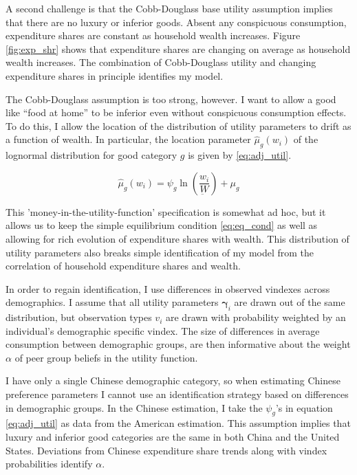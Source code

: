 A second challenge is that the Cobb-Douglass base utility assumption implies that there are no luxury or inferior goods.  Absent any conspicuous consumption, expenditure shares are constant as household  wealth increases.  Figure \ref{fig:exp_shr} shows that expenditure shares are changing on average as household wealth increases.  The combination of Cobb-Douglass utility and changing expenditure shares in principle identifies my model.

The Cobb-Douglass assumption is too strong, however.  I want to allow a good like ``food at home'' to be inferior even without conspicuous consumption effects.  To do this, I allow the location of the distribution of utility parameters to drift as a function of wealth.  In particular, the location parameter $\hat{\mu}_g(w_i)$ of the lognormal distribution for good category $g$ is given by \eqref{eq:adj_util}.

\begin{equation}
    \label{eq:adj_util}
    \hat{\mu}_g(w_i) = \psi_g \ln \left(\frac{w_i}{\underbar{W}}\right) + \mu_g
\end{equation}

This 'money-in-the-utility-function' specification is somewhat ad hoc, but it allows us to keep the simple equilibrium condition \eqref{eq:eq_cond} as well as allowing for rich evolution of expenditure shares with wealth.  This distribution of utility parameters also breaks simple identification of my model from the correlation of household expenditure shares and wealth.

In order to regain identification, I use differences in observed vindexes across demographics.  I assume that all utility parameters $\boldsymbol{\gamma}_i$ are drawn out of the same distribution, but observation types $v_i$ are drawn with probability weighted by an individual's demographic specific vindex.  The size of differences in average consumption between demographic groups, are then informative about the weight $\alpha$ of peer group beliefs in the utility function.

I have only a single Chinese demographic category, so when estimating Chinese preference parameters I cannot use an identification strategy based on differences in demographic groups.  In the Chinese estimation, I take the $\psi_g$'s in equation \eqref{eq:adj_util} as data from the American estimation.  This assumption implies that luxury and inferior good categories are the same in both China and the United States.  Deviations from Chinese expenditure share trends along with vindex probabilities identify $\alpha$.

